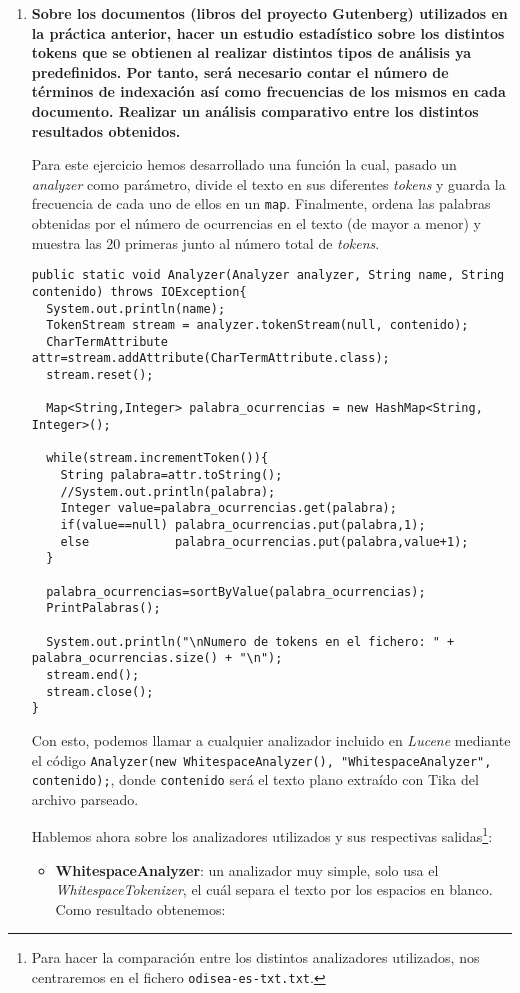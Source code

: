 \begin{enumerate}
\item \textbf{Sobre los documentos (libros del proyecto Gutenberg) utilizados en la práctica anterior, hacer un estudio estadístico sobre los distintos tokens que se obtienen al realizar distintos tipos de análisis ya predefinidos. Por tanto, será necesario contar el número de términos de indexación así como frecuencias
de los mismos en cada documento. Realizar un análisis comparativo entre los distintos resultados obtenidos.}

Para este ejercicio hemos desarrollado una función la cual, pasado un \textit{analyzer} como parámetro, divide el texto en sus diferentes \textit{tokens} y guarda la frecuencia de cada uno de ellos en un \texttt{map}. Finalmente, ordena las palabras obtenidas por el número de ocurrencias en el texto (de mayor a menor) y muestra las 20 primeras junto al número total de \textit{tokens}.


\begin{lstlisting}
public static void Analyzer(Analyzer analyzer, String name, String contenido) throws IOException{
  System.out.println(name);
  TokenStream stream = analyzer.tokenStream(null, contenido);
  CharTermAttribute attr=stream.addAttribute(CharTermAttribute.class);
  stream.reset();
  
  Map<String,Integer> palabra_ocurrencias = new HashMap<String, Integer>();
  
  while(stream.incrementToken()){
    String palabra=attr.toString();
    //System.out.println(palabra);
    Integer value=palabra_ocurrencias.get(palabra);
    if(value==null) palabra_ocurrencias.put(palabra,1);
    else            palabra_ocurrencias.put(palabra,value+1);
  }
  
  palabra_ocurrencias=sortByValue(palabra_ocurrencias);		
  PrintPalabras();
  
  System.out.println("\nNumero de tokens en el fichero: " + palabra_ocurrencias.size() + "\n");
  stream.end();
  stream.close();
}
\end{lstlisting}

Con esto, podemos llamar a cualquier analizador incluido en \textit{Lucene} mediante el código \texttt{Analyzer(new WhitespaceAnalyzer(), "WhitespaceAnalyzer", contenido);}, donde \texttt{contenido} será el texto plano extraído con Tika del archivo parseado.

Hablemos ahora sobre los analizadores utilizados y sus respectivas salidas\footnote{Para hacer la comparación entre los distintos analizadores utilizados, nos centraremos en el fichero \texttt{odisea-es-txt.txt}.}:
\begin{itemize}
	\item \textbf{WhitespaceAnalyzer}: un analizador muy simple, solo usa el \textit{WhitespaceTokenizer}, el cuál separa el texto por los espacios en blanco. Como resultado obtenemos:
	

\end{itemize}
\end{enumerate}

